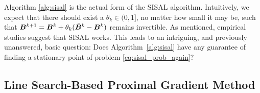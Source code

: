 \documentclass[10pt,twocolumn,twoside]{IEEEtran}
\begin{document}
Algorithm \ref{alg:sisal} is the actual form of the SISAL algorithm. Intuitively, we expect that there should exist a $\theta_k \in (0,1]$, no matter how small it may be, such that ${\bm B}^{k+1} =  {\bm B}^k + \theta_k (\bar{{\bm B}}^k - {\bm B}^k )$ remains invertible.
As mentioned, empirical studies suggest that SISAL works.
This leads to an intriguing, and previously unanswered, basic question:
Does Algorithm~\ref{alg:sisal} have any guarantee of finding a stationary point of problem \eqref{eq:sisal_prob_again}?


\subsection{Line Search-Based Proximal Gradient Method}
\label{sect:lsb_pg}
\end{document}
